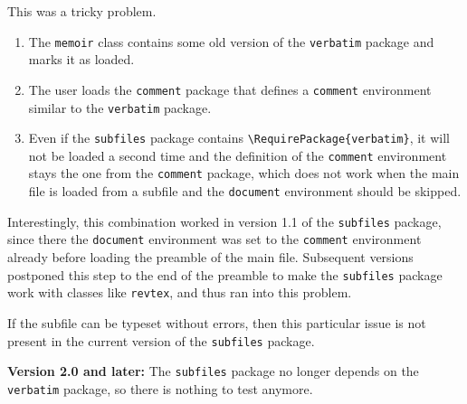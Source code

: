 \documentclass[main]{subfiles}
\begin{document}
This was a tricky problem.
\begin{enumerate}
\item The \verb|memoir| class contains some old version of the
  \verb|verbatim| package and marks it as loaded.
\item The user loads the \verb|comment| package that defines a
  \verb|comment| environment similar to the \verb|verbatim| package.
\item Even if the \verb|subfiles| package contains
  \verb|\RequirePackage{verbatim}|, it will not be loaded a second
  time and the definition of the \verb|comment| environment
  stays the one from the \verb|comment| package, which does not work
  when the main file is loaded from a subfile and the \verb|document|
  environment should be skipped.
\end{enumerate}
Interestingly, this combination worked in version 1.1 of the
\verb|subfiles| package, since there the \verb|document| environment
was set to the \verb|comment| environment already before loading the
preamble of the main file. Subsequent versions postponed this step to
the end of the preamble to make the \verb|subfiles| package work with
classes like \verb|revtex|, and thus ran into this problem.

If the subfile can be typeset without errors, then this particular
issue is not present in the current version of the \verb|subfiles|
package.
\bigskip

\textbf{Version 2.0 and later:} The \verb|subfiles| package no longer
depends on the \verb|verbatim| package, so there is nothing to test anymore.
\end{document}
